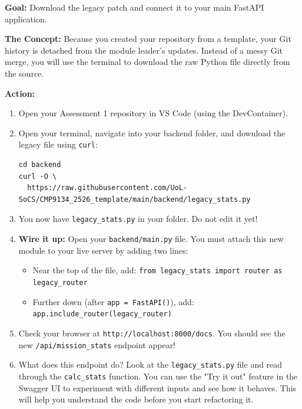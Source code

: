 \documentclass[a4paper,12pt]{article}
\begin{document}
\textbf{Goal:} Download the legacy patch and connect it to your main FastAPI application.

\textbf{The Concept:} Because you created your repository from a template, your Git history is detached from the module leader's updates. Instead of a messy Git merge, you will use the terminal to download the raw Python file directly from the source.

\vspace{0.3cm}
\textbf{Action:}
\begin{enumerate}
    \item Open your Assessment 1 repository in VS Code (using the DevContainer).
    \item Open your terminal, navigate into your backend folder, and download the legacy file using \texttt{curl}:
    \begin{verbatim}
cd backend
curl -O \
  https://raw.githubusercontent.com/UoL-SoCS/CMP9134_2526_template/main/backend/legacy_stats.py
    \end{verbatim}
    \item You now have \texttt{legacy\_stats.py} in your folder. Do not edit it yet!
    \item \textbf{Wire it up:} Open your \texttt{backend/main.py} file. You must attach this new module to your live server by adding two lines:
    \begin{itemize}
        \item Near the top of the file, add: \texttt{from legacy\_stats import router as legacy\_router}
        \item Further down (after \texttt{app = FastAPI()}), add: \texttt{app.include\_router(legacy\_router)}
    \end{itemize}
    \item Check your browser at \texttt{http://localhost:8000/docs}. You should see the new \texttt{/api/mission\_stats} endpoint appear!
    \item What does this endpoint do? Look at the \texttt{legacy\_stats.py} file and read through the \texttt{calc\_stats} function. You can use the "Try it out" feature in the Swagger UI to experiment with different inputs and see how it behaves. This will help you understand the code before you start refactoring it.
\end{enumerate}

\end{document}
